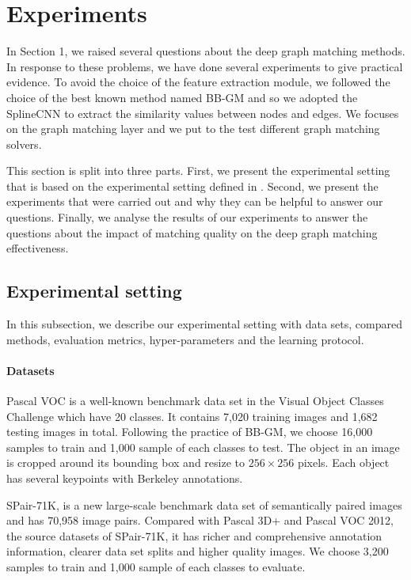 \documentclass[times,onecolumn,final,authoryear]{article}
\theoremstyle{definition}
\begin{document}
\section{Experiments}
In Section 1, we raised several questions about the deep graph matching methods. In response to these problems, we have done several experiments to give practical evidence. 
To avoid the choice of the feature extraction module, we followed the choice of the best known method named BB-GM \cite{BB-GM} and so we adopted the SplineCNN\cite{fey2018splinecnn} to extract the similarity values between nodes and edges. We focuses on the graph matching layer and we put to the test different graph matching solvers. 

This section is split into three parts. First, we present the experimental setting that is based on the experimental setting defined in \cite{BB-GM}. Second, we present the experiments that were carried out and why they can be helpful to answer our questions. Finally, we analyse the results of our experiments to answer the questions about the impact of matching quality on the deep graph matching effectiveness.  


\subsection{Experimental setting}
In this subsection, we describe our experimental setting with data sets, compared methods, evaluation metrics, hyper-parameters and the learning protocol. 
\paragraph{Datasets}
Pascal VOC\cite{everingham2010pascal} is a well-known benchmark data set in the Visual Object Classes Challenge which have 20 classes. It contains 7,020 training images and 1,682 testing images in total. Following the practice of BB-GM\cite{BB-GM}, we choose 16,000 samples to train and 1,000 sample of each classes to test. The object in an image is cropped around its bounding box and resize to $256\times 256$ pixels. Each object has several keypoints with Berkeley annotations\cite{bourdev2009poselets}. 


SPair-71K\cite{min2019spair}, is a new large-scale benchmark data set of semantically paired images and has 70,958 image pairs. Compared with Pascal 3D+ and Pascal VOC 2012, the source datasets of SPair-71K\cite{min2019spair}, it has richer and comprehensive annotation information, clearer data set splits and higher quality images. We choose 3,200 samples to train and 1,000 sample of each classes to evaluate.
\end{document}
